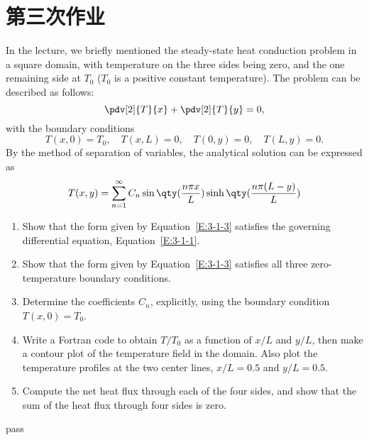 \section{第三次作业}

\begin{homework}[label={H:3-1}]
    In the lecture, we briefly mentioned the steady-state heat conduction problem in a square domain, with temperature on the three sides being zero, and the one remaining side at $T_0$ ($T_0$ is a positive constant temperature). The problem can be described as follows:
    \begin{equation}\label{E:3-1-1}
        \pdv[2]{T}{x} + \pdv[2]{T}{y} = 0,
    \end{equation}
    with the boundary conditions
    \begin{equation}\label{E:3-1-2}
        T(x, 0) = T_0, \quad
        T(x, L) =   0, \quad
        T(0, y) =   0, \quad
        T(L, y) =   0.
    \end{equation}
    By the method of separation of variables, the analytical solution can be expressed as
    \begin{equation}\label{E:3-1-3}
        T(x, y) = \sum_{n=1}^\infty C_n\sin\qty(\frac{n\pi x}{L})\sinh\qty(\frac{n\pi (L-y)}{L})
    \end{equation}

    \begin{enumerate}[label=(\alph*)]
        \item Show that the form given by Equation~\eqref{E:3-1-3} satisfies the governing differential equation, Equation~\eqref{E:3-1-1}.
        \item Show that the form given by Equation~\eqref{E:3-1-3} satisfies all three zero-temperature boundary conditions.
        \item Determine the coefficients $C_n$, explicitly, using the boundary condition $T(x, 0)=T_0$.
        \item Write a Fortran code to obtain $T/T_0$ as a function of $x/L$ and $y/L$, then make a contour plot of the temperature field in the domain. Also plot the temperature profiles at the two center lines, $x/L=0.5$ and $y/L=0.5$.
        \item Compute the net heat flux through each of the four sides, and show that the sum of the heat flux through four sides is zero.
    \end{enumerate}
\end{homework}

pass



